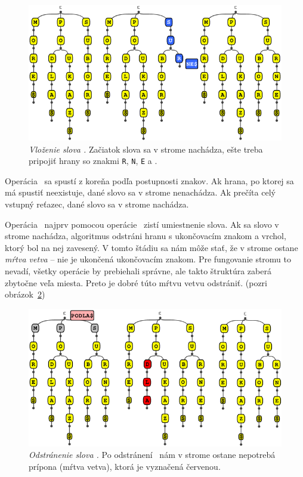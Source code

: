 \begin{figure}
\includegraphics[width=\columnwidth]{obrazky/trieinsertsmall.png}
\caption{\emph{Vloženie slova .} Začiatok slova 
 sa v strome nachádza, ešte treba pripojiť hrany 
so znakmi {\tt R}, {\tt N}, {\tt E} a \uz.} 
\label{img:trieinsert} 
\end{figure}

Operácia \find\ sa spustí z koreňa podľa postupnosti znakov. Ak hrana, 
po ktorej sa má spustiť neexistuje, dané slovo sa v strome nenachádza. 
Ak prečíta celý vstupný reťazec, dané slovo sa v strome nachádza.

Operácia \delete\ najprv pomocou operácie \find\ zistí umiestnenie slova. 
Ak sa slovo v strome nachádza, algoritmus odstráni hranu s ukončovacím 
znakom a vrchol, ktorý bol na nej zavesený. V tomto štádiu sa nám môže 
stať, že v strome ostane \emph{mŕtva vetva} -- nie je ukončená 
ukončovacím znakom. Pre fungovanie stromu to nevadí, všetky operácie by 
prebiehali správne, ale takto štruktúra zaberá zbytočne veľa miesta. 
Preto je dobré túto mŕtvu vetvu odstrániť. 
(pozri obrázok~\ref{img:triedelete})

\begin{figure}
\includegraphics[width=\columnwidth]{obrazky/triedeletesmall.png}
\caption{\emph{Odstránenie slova .} Po odstránení 
\uz\ nám v strome ostane nepotrebá prípona  (mŕtva vetva), 
ktorá je vyznačená červenou.}
\label{img:triedelete} 
\end{figure}

